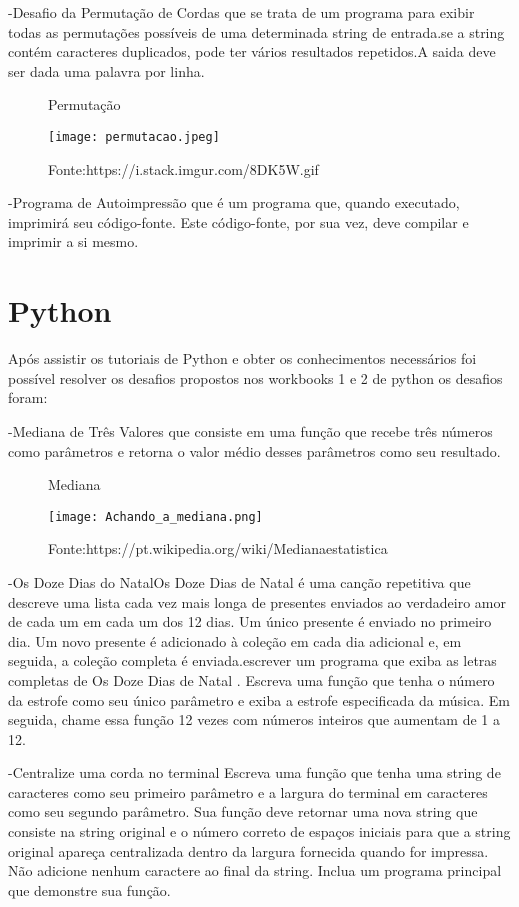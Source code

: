     -Desafio da Permutação de Cordas que se trata de um programa para exibir todas as permutações possíveis de uma determinada string de entrada.se a string contém caracteres duplicados, pode ter vários resultados repetidos.A saida deve ser dada uma palavra por linha.

\begin{figure} [h!]	
    \centering
    \caption{Permutação}
    \texttt{[image: permutacao.jpeg]}
    \caption*{Fonte:https://i.stack.imgur.com/8DK5W.gif}
    \label{fig:permutacaodeletras}
\end{figure}

    -Programa de Autoimpressão que é um programa que, quando executado, imprimirá seu código-fonte. Este código-fonte, por sua vez, deve compilar e imprimir a si mesmo. 
\section{Python}
Após assistir os tutoriais de Python e obter os conhecimentos necessários foi possível resolver os desafios propostos nos workbooks 1 e 2 de python os desafios foram: 

-Mediana de Três Valores que consiste em uma função que recebe três números como parâmetros e retorna o valor médio desses parâmetros como seu resultado.
\begin{figure} [h!]	
    \centering
    \caption{Mediana}
    \texttt{[image: Achando\_a\_mediana.png]}
    \caption*{Fonte:https://pt.wikipedia.org/wiki/Medianaestatistica}
    \label{fig:mediana}
\end{figure}

-Os Doze Dias do NatalOs Doze Dias de Natal é uma canção repetitiva que descreve uma lista cada vez mais longa de presentes enviados ao verdadeiro amor de cada um em cada um dos 12 dias. Um único presente é enviado no primeiro dia. Um novo presente é adicionado à coleção em cada dia adicional e, em seguida, a coleção completa é enviada.escrever um programa que exiba as letras completas de Os Doze Dias de Natal . Escreva uma função que tenha o número da estrofe como seu único parâmetro e exiba a estrofe especificada da música. Em seguida, chame essa função 12 vezes com números inteiros que aumentam de 1 a 12.

-Centralize uma corda no terminal Escreva uma função que tenha uma string de caracteres como seu primeiro parâmetro e a largura do terminal em caracteres como seu segundo parâmetro. Sua função deve retornar uma nova string que consiste na string original e o número correto de espaços iniciais para que a string original apareça centralizada dentro da largura fornecida quando for impressa. Não adicione nenhum caractere ao final da string. Inclua um programa principal que demonstre sua função.


